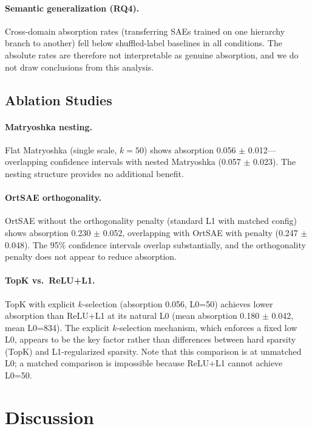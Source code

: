 \documentclass{article}
\begin{document}
\paragraph{Semantic generalization (RQ4).} Cross-domain absorption rates (transferring SAEs trained on one hierarchy branch to another) fell below shuffled-label baselines in all conditions. The absolute rates are therefore not interpretable as genuine absorption, and we do not draw conclusions from this analysis.

\subsection{Ablation Studies}

\paragraph{Matryoshka nesting.} Flat Matryoshka (single scale, $k=50$) shows absorption 0.056 $\pm$ 0.012---overlapping confidence intervals with nested Matryoshka (0.057 $\pm$ 0.023). The nesting structure provides no additional benefit.

\paragraph{OrtSAE orthogonality.} OrtSAE without the orthogonality penalty (standard L1 with matched config) shows absorption 0.230 $\pm$ 0.052, overlapping with OrtSAE with penalty (0.247 $\pm$ 0.048). The 95\% confidence intervals overlap substantially, and the orthogonality penalty does not appear to reduce absorption.

\paragraph{TopK vs.~ReLU+L1.} TopK with explicit $k$-selection (absorption 0.056, L0=50) achieves lower absorption than ReLU+L1 at its natural L0 (mean absorption 0.180 $\pm$ 0.042, mean L0=834). The explicit $k$-selection mechanism, which enforces a fixed low L0, appears to be the key factor rather than differences between hard sparsity (TopK) and L1-regularized sparsity. Note that this comparison is at unmatched L0; a matched comparison is impossible because ReLU+L1 cannot achieve L0=50.

\section{Discussion}
\end{document}
